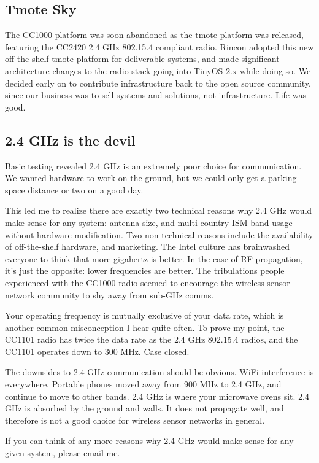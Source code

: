 \documentclass{article}
\begin{document}
\subsection{Tmote Sky}
The CC1000 platform was soon abandoned as the tmote platform was released, featuring the CC2420 
2.4 GHz 802.15.4 compliant radio. Rincon adopted this new off-the-shelf tmote platform for 
deliverable systems, and made significant architecture changes to the radio stack going into 
TinyOS 2.x while doing so. We decided early on to contribute infrastructure back to the
open source community, since our business was to sell systems and solutions, not infrastructure. Life was good.

\subsection{2.4 GHz is the devil}
Basic testing revealed 2.4 GHz is an extremely poor choice for communication. We wanted hardware
to work on the ground, but we could only get a parking space distance or two on a good day. 

This led me to realize there are exactly two technical reasons why 2.4 GHz would make sense 
for any system: antenna size, and multi-country ISM band usage without hardware modification. 
Two non-technical reasons include the availability of off-the-shelf hardware, and marketing. 
The Intel culture has brainwashed everyone to think 
that more gigahertz is better. In the case of RF propagation, it's just the opposite: lower frequencies
are better. The tribulations people experienced with the CC1000 radio seemed to encourage
the wireless sensor network community to shy away from sub-GHz comms.

Your operating frequency is mutually exclusive of your data rate, which is another 
common misconception I hear quite often. To prove my point, the CC1101 radio has twice the 
data rate as the 2.4 GHz 802.15.4 radios, and the CC1101 operates down to 300 MHz. Case closed.

The downsides to 2.4 GHz communication should be obvious. WiFi interference is everywhere. Portable
phones moved away from 900 MHz to 2.4 GHz, and continue to move to other bands. 2.4 GHz is where
your microwave ovens sit. 2.4 GHz is absorbed by the ground and walls.  It does not propagate well, 
and therefore is not a good choice for wireless sensor networks in general.

If you can think of any more reasons why 2.4 GHz would make sense for any given system, please email me. 
\end{document}
